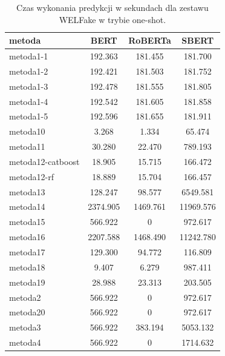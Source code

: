 \begin{table}[H]
	\centering
	\caption{Czas wykonania predykcji w sekundach dla zestawu WELFake w trybie one-shot.}
	\label{tab:execution_time_one_shot_welfake}
	\small
	\begin{tabular}{lccc}
		\toprule
		\textbf{metoda}   & \textbf{BERT} & \textbf{RoBERTa} & \textbf{SBERT} \\
		\midrule
		metoda1-1         & 192.363       & 181.455          & 181.700        \\
		metoda1-2         & 192.421       & 181.503          & 181.752        \\
		metoda1-3         & 192.478       & 181.555          & 181.805        \\
		metoda1-4         & 192.542       & 181.605          & 181.858        \\
		metoda1-5         & 192.596       & 181.655          & 181.911        \\
		metoda10          & 3.268         & 1.334            & 65.474         \\
		metoda11          & 30.280        & 22.470           & 789.193        \\
		metoda12-catboost & 18.905        & 15.715           & 166.472        \\
		metoda12-rf       & 18.889        & 15.704           & 166.457        \\
		metoda13          & 128.247       & 98.577           & 6549.581       \\
		metoda14          & 2374.905      & 1469.761         & 11969.576      \\
		metoda15          & 566.922       &   0              & 972.617        \\
		metoda16          & 2207.588      & 1468.490         & 11242.780      \\
		metoda17          & 129.300       & 94.772           & 116.809        \\
		metoda18          & 9.407         & 6.279            & 987.411        \\
		metoda19          & 28.988        & 23.313           & 203.505        \\
		metoda2           & 566.922       &   0              & 972.617        \\
		metoda20          & 566.922       &   0              & 972.617        \\
		metoda3           & 566.922       & 383.194          & 5053.132       \\
		metoda4           & 566.922       &   0              & 1714.632       \\

\end{tabular}
\end{table}
